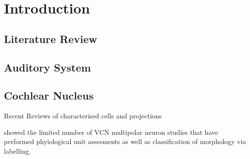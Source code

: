 \documentclass[10pt,a4paper,twoside,openright]{book}
\begin{document}
		{%
			\singlespacing%
			\tableofcontents%
			\listoffigures%
			\listoftables
                        \printglossaries
		   \clearpage%
		}%
\setcounter{chapter}{0}

\chapter{Introduction}\label{Ch1:introduction}


\section{Literature Review}\label{Ch1:litreview}
\section{Auditory System}\label{Ch1:AuditorySystem}

\section{Cochlear Nucleus}\label{Ch1:CochelarNucleus}


Recent Reviews of characterised cells and projections
\citep{CantBenson:2003,RyugoParks:2003,SmithMassieEtAl:2005,YoungOertel:2004,OertelWrightEtAl:2010}

\citet{DoucetRyugo:2006} showed the limited number of VCN multipolar neuron studies that have performed phyiological unit assesments as well as classification of morphology via labelling.
\end{document}
